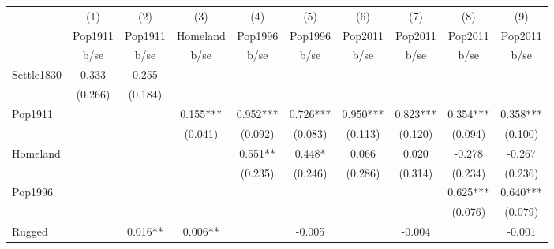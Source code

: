 {
\def\sym#1{\ifmmode^{#1}\else\(^{#1}\)\fi}
\begin{tabular}{l*{9}{c}}
\hline\hline
                    &\multicolumn{1}{c}{(1)}&\multicolumn{1}{c}{(2)}&\multicolumn{1}{c}{(3)}&\multicolumn{1}{c}{(4)}&\multicolumn{1}{c}{(5)}&\multicolumn{1}{c}{(6)}&\multicolumn{1}{c}{(7)}&\multicolumn{1}{c}{(8)}&\multicolumn{1}{c}{(9)}\\
                    &\multicolumn{1}{c}{Pop1911}&\multicolumn{1}{c}{Pop1911}&\multicolumn{1}{c}{Homeland}&\multicolumn{1}{c}{Pop1996}&\multicolumn{1}{c}{Pop1996}&\multicolumn{1}{c}{Pop2011}&\multicolumn{1}{c}{Pop2011}&\multicolumn{1}{c}{Pop2011}&\multicolumn{1}{c}{Pop2011}\\
                    &        b/se   &        b/se   &        b/se   &        b/se   &        b/se   &        b/se   &        b/se   &        b/se   &        b/se   \\
\hline
Settle1830          &       0.333   &       0.255   &               &               &               &               &               &               &               \\
                    &     (0.266)   &     (0.184)   &               &               &               &               &               &               &               \\
Pop1911             &               &               &       0.155***&       0.952***&       0.726***&       0.950***&       0.823***&       0.354***&       0.358***\\
                    &               &               &     (0.041)   &     (0.092)   &     (0.083)   &     (0.113)   &     (0.120)   &     (0.094)   &     (0.100)   \\
Homeland            &               &               &               &       0.551** &       0.448*  &       0.066   &       0.020   &      -0.278   &      -0.267   \\
                    &               &               &               &     (0.235)   &     (0.246)   &     (0.286)   &     (0.314)   &     (0.234)   &     (0.236)   \\
Pop1996             &               &               &               &               &               &               &               &       0.625***&       0.640***\\
                    &               &               &               &               &               &               &               &     (0.076)   &     (0.079)   \\
Rugged              &               &       0.016** &       0.006** &               &      -0.005   &               &      -0.004   &               &      -0.001   \\

\end{tabular}}
